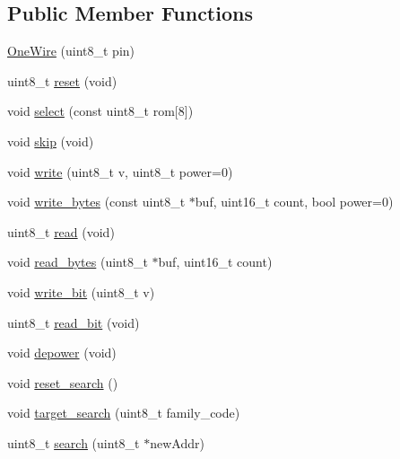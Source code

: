 \subsection*{\-Public \-Member \-Functions}
\begin{DoxyCompactItemize}
\item 
\hyperlink{class_one_wire_aa3f23dc51d861a8d257648c507b14e8d}{\-One\-Wire} (uint8\-\_\-t pin)
\item 
uint8\-\_\-t \hyperlink{class_one_wire_a6a742a9112392567eae3d06dde067c07}{reset} (void)
\item 
void \hyperlink{class_one_wire_accf808390abd63d3c7bce35677784384}{select} (const uint8\-\_\-t rom\mbox{[}8\mbox{]})
\item 
void \hyperlink{class_one_wire_ae3780e2b0ea2ebf6be88298412ac7798}{skip} (void)
\item 
void \hyperlink{class_one_wire_a843e9e7e57ed615b4880be0b76b40b7d}{write} (uint8\-\_\-t v, uint8\-\_\-t power=0)
\item 
void \hyperlink{class_one_wire_a0fc1e0bdc2ab1f062c98567fa60a69ae}{write\-\_\-bytes} (const uint8\-\_\-t $\ast$buf, uint16\-\_\-t count, bool power=0)
\item 
uint8\-\_\-t \hyperlink{class_one_wire_afd9bdb8b5a5b69b394dfc76352e00e21}{read} (void)
\item 
void \hyperlink{class_one_wire_a2407440e8e25b624617593f8ad6447d4}{read\-\_\-bytes} (uint8\-\_\-t $\ast$buf, uint16\-\_\-t count)
\item 
void \hyperlink{class_one_wire_a6bbc58276d1cb08653dab3ea35378f94}{write\-\_\-bit} (uint8\-\_\-t v)
\item 
uint8\-\_\-t \hyperlink{class_one_wire_aeae4c2798b70d9d0ba3091c03ee2d056}{read\-\_\-bit} (void)
\item 
void \hyperlink{class_one_wire_aa8e0f62e830ad05d8035e55c7a309256}{depower} (void)
\item 
void \hyperlink{class_one_wire_aae5efdf67928b5ee312ab7d7906416fa}{reset\-\_\-search} ()
\item 
void \hyperlink{class_one_wire_a0a1b8457adb609a693b865dd474e5116}{target\-\_\-search} (uint8\-\_\-t family\-\_\-code)
\item 
uint8\-\_\-t \hyperlink{class_one_wire_a383dc74fc9f8a27b76366a2859c3820a}{search} (uint8\-\_\-t $\ast$new\-Addr)
\end{DoxyCompactItemize}
